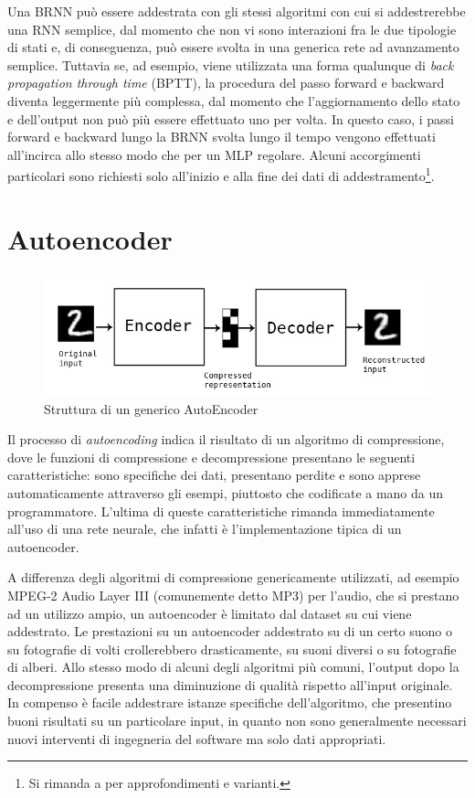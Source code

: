 Una BRNN può essere addestrata con gli stessi algoritmi con cui si addestrerebbe una RNN semplice, dal momento che non vi sono interazioni fra le due tipologie di stati e, di conseguenza, può essere svolta in una generica rete ad avanzamento semplice. Tuttavia se, ad esempio, viene utilizzata una forma qualunque di \textit{back propagation through time} (BPTT), la procedura del passo forward e backward diventa leggermente più complessa, dal momento che l'aggiornamento dello stato e dell'output non può più essere effettuato uno per volta. In questo caso, i passi forward e backward lungo la BRNN svolta lungo il tempo vengono effettuati all'incirca allo stesso modo che per un MLP regolare. Alcuni accorgimenti particolari sono richiesti solo all'inizio e alla fine dei dati di addestramento\footnote{Si rimanda a \cite{BRNN} per approfondimenti e varianti.}.
\section{Autoencoder}
\begin{figure}[ht]
	\centering
	\includegraphics[width=0.8\linewidth]{img/autoencoder_schema.jpg}
	\caption{Struttura di un generico AutoEncoder}
	\label{fig:1.12}
\end{figure}
Il processo di \textit{autoencoding} indica il risultato di un algoritmo di compressione, dove le funzioni di compressione e decompressione presentano le seguenti caratteristiche: sono specifiche dei dati, presentano perdite e sono apprese automaticamente attraverso gli esempi, piuttosto che codificate a mano da un programmatore. L'ultima di queste caratteristiche rimanda immediatamente all'uso di una rete neurale, che infatti è l'implementazione tipica di un autoencoder.

A differenza degli algoritmi di compressione genericamente utilizzati, ad esempio MPEG-2 Audio Layer III (comunemente detto MP3) per l'audio, che si prestano ad un utilizzo ampio, un autoencoder è limitato dal dataset su cui viene addestrato. Le prestazioni su un autoencoder addestrato su di un certo suono o su fotografie di volti crollerebbero drasticamente, su suoni diversi o su fotografie di alberi. Allo stesso modo di alcuni degli algoritmi più comuni, l'output dopo la decompressione presenta una diminuzione di qualità rispetto all'input originale. In compenso è facile addestrare istanze specifiche dell'algoritmo, che presentino buoni risultati su un particolare input, in quanto non sono generalmente necessari nuovi interventi di ingegneria del software ma solo dati appropriati.

